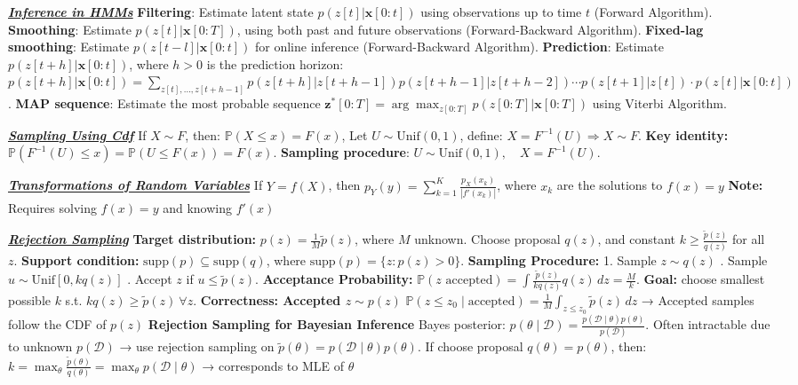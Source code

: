 \documentclass[10pt]{article}
\newcommand{\bulletPoint}[1]{\ul{\textit{\textbf{#1}}}}
\begin{document}
\begin{multicols*}{2}
\bulletPoint{Inference in HMMs}\quad
\textbf{Filtering}: Estimate latent state $p(z[t] | \mathbf{x}[0:t])$ using observations up to time $t$ ({Forward Algorithm}). 
\textbf{Smoothing}: Estimate $p(z[t] | \mathbf{x}[0:T])$, using both past and future observations ({Forward-Backward Algorithm}). 
\textbf{Fixed-lag smoothing}: Estimate $p(z[t-l] | \mathbf{x}[0:t])$ for online inference ({Forward-Backward Algorithm}). 
\textbf{Prediction}: Estimate $p(z[t+h] | \mathbf{x}[0:t])$, where $h > 0$ is the prediction horizon:
$p(z[t+h] | \mathbf{x}[0:t]) = \sum_{z[t],...,z[t+h-1]} p(z[t+h] | z[t+h-1]) p(z[t+h-1] | z[t+h-2]) \cdots p(z[t+1] | z[t]) \cdot p(z[t] | \mathbf{x}[0:t])$. 
\textbf{MAP sequence}: Estimate the most probable sequence $\mathbf{z}^*[0:T] = \arg\max_{z[0:T]} p(z[0:T] | \mathbf{x}[0:T])$ using {Viterbi Algorithm}.


\bulletPoint{Sampling Using Cdf}\quad
If \( X \sim F \), then:
$\mathbb{P}(X \leq x) = F(x)$, \quad
Let \( U \sim \text{Unif}(0,1) \), define:
$X = F^{-1}(U)
\Rightarrow X \sim F$. 
\textbf{Key identity:}
$\mathbb{P}(F^{-1}(U) \leq x) = \mathbb{P}(U \leq F(x)) = F(x)$. 
\textbf{Sampling procedure}:
$U \sim \text{Unif}(0,1), \quad X = F^{-1}(U)$. 

\bulletPoint{Transformations of Random Variables}\quad
If \( Y = f(X) \), then \( p_Y(y) = \sum_{k=1}^K \frac{p_X(x_k)}{|f'(x_k)|} \), where \( x_k \) are the solutions to \( f(x) = y \)
\textbf{Note:} Requires solving \( f(x) = y \) and knowing \( f'(x) \)


\bulletPoint{Rejection Sampling}\quad
\textbf{Target distribution:} \( p(z) = \frac{1}{M} \tilde{p}(z) \), where \( M \) unknown. 
Choose proposal \( q(z) \), and constant \( k \geq \frac{\tilde{p}(z)}{q(z)} \) for all \( z \). 
\textbf{Support condition:} \( \text{supp}(p) \subseteq \text{supp}(q) \), where \( \text{supp}(p) = \{ z : p(z) > 0 \} \). 
\textbf{Sampling Procedure:}
1. Sample \( z \sim q(z) \) . Sample \( u \sim \text{Unif}[0, kq(z)] \) . Accept \( z \) if \( u \leq \tilde{p}(z) \). 
\textbf{Acceptance Probability:}
$\mathbb{P}(z\text{ accepted}) = \int \frac{\tilde{p}(z)}{kq(z)} q(z)\,dz = \frac{M}{k}$. 
\textbf{Goal: } choose smallest possible \( k \) s.t. \( kq(z) \geq \tilde{p}(z) \ \forall z \). 
\textbf{Correctness: Accepted \( z \sim p(z) \)}
$\mathbb{P}(z \leq z_0 \mid \text{accepted}) = \frac{1}{M} \int_{z \leq z_0} \tilde{p}(z)\,dz$
→ Accepted samples follow the CDF of \( p(z) \)
\textbf{Rejection Sampling for Bayesian Inference}
Bayes posterior: \( p(\theta \mid \mathcal{D}) = \frac{p(\mathcal{D} \mid \theta) p(\theta)}{p(\mathcal{D})} \). 
Often intractable due to unknown \( p(\mathcal{D}) \) → use rejection sampling on \( \tilde{p}(\theta) = p(\mathcal{D} \mid \theta) p(\theta) \). 
If choose proposal \( q(\theta) = p(\theta) \), then:
$k = \max_\theta \frac{\tilde{p}(\theta)}{q(\theta)} = \max_\theta p(\mathcal{D} \mid \theta)$
→ corresponds to MLE of \( \theta \)


\end{multicols*}
\end{document}

